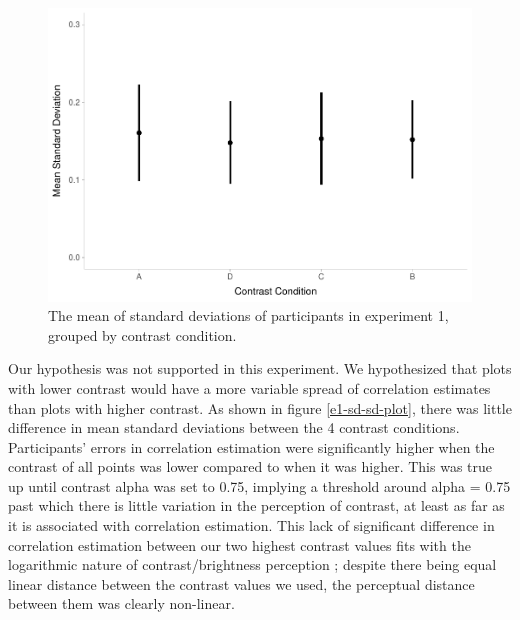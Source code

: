 \documentclass[preprint, 3p,
authoryear]{elsarticle} %
\begin{document}
\begin{figure}

\includegraphics[width=0.5\linewidth]{contrast_and_scatterplots_files/figure-latex/e1-sd-sd-plot-1} \hfill{}

\caption{\label{e1-sd-sd-plot}The mean of standard deviations of participants in experiment 1, grouped by contrast condition.}\label{fig:e1-sd-sd-plot}
\end{figure}

Our hypothesis was not supported in this experiment. We hypothesized
that plots with lower contrast would have a more variable spread of
correlation estimates than plots with higher contrast. As shown in
figure \ref{e1-sd-sd-plot}, there was little difference in mean standard
deviations between the 4 contrast conditions. Participants' errors in
correlation estimation were significantly higher when the contrast of
all points was lower compared to when it was higher. This was true up
until contrast alpha was set to 0.75, implying a threshold around alpha
= 0.75 past which there is little variation in the perception of
contrast, at least as far as it is associated with correlation
estimation. This lack of significant difference in correlation
estimation between our two highest contrast values fits with the
logarithmic nature of contrast/brightness perception
\citep{varshney_2013, fechner_1948}; despite there being equal linear
distance between the contrast values we used, the perceptual distance
between them was clearly non-linear.
\end{document}
